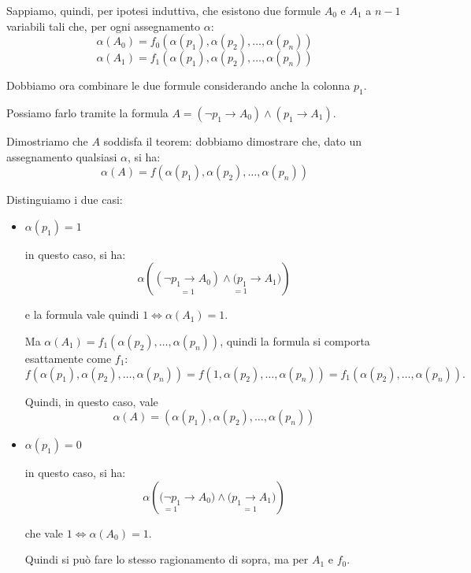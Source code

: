 \documentclass[a4paper,11pt]{report}
\begin{document}
\begin{proofbox}[title=dimostrazione]
\begin{itemize}
            Sappiamo, quindi, per ipotesi induttiva, che esistono due formule \( A_0 \) e \( A_1 \) a \( n-1 \) variabili tali che, per ogni assegnamento \( \alpha \):
            \[ \alpha(A_0) = f_0(\alpha(p_1), \alpha(p_2), \dots, \alpha(p_n)) \]
            \[ \alpha(A_1) = f_1(\alpha(p_1), \alpha(p_2), \dots, \alpha(p_n)) \]

            Dobbiamo ora combinare le due formule considerando anche la colonna \( p_1 \).

            Possiamo farlo tramite la formula \(A= (\neg p_1 \to A_0) \land (p_1 \to A_1) \).

            Dimostriamo che \( A \) soddisfa il teorem: dobbiamo dimostrare che, dato un assegnamento qualsiasi \( \alpha \), si ha:
    \[ \alpha(A) = f(\alpha(p_1), \alpha(p_2), \dots, \alpha(p_n)) \]

    Distinguiamo i due casi:
    \begin{itemize}
        \item \( \alpha(p_1) = 1 \) 

            in questo caso, si ha:
            \[
                \alpha\!\left(
                    \underset{=1}{(\neg p_1 \to A_0)}
                    \land
                \underset{=1}{(p_1} \to A_1)
                \right)
            \]

            e la formula vale quindi \( 1 \iff \alpha(A_1) = 1 \).

            Ma \( \alpha(A_1) = f_1(\alpha(p_2), \dots, \alpha(p_n)) \), quindi la formula si comporta esattamente come \( f_1 \):
            \[
                f(\alpha(p_1), \alpha(p_2), \ldots, \alpha(p_n))
                = f(1, \alpha(p_2), \ldots, \alpha(p_n))
                = f_1(\alpha(p_2), \ldots, \alpha(p_n)).
            \]

            Quindi, in questo caso, vale 
            \[\alpha(A) = (\alpha(p_1), \alpha(p_2), \ldots, \alpha(p_n))\]

        \item \( \alpha(p_1) = 0 \)            

            in questo caso, si ha:
            \[
                \alpha\!\left(
                    \underset{=1}{(\neg p_1} \to A_0)
                    \land
                    \underset{=1}{(p_1 \to A_1})
            \right)\]

            che vale \( 1 \iff \alpha(A_0)=1\).

            Quindi si può fare lo stesso ragionamento di sopra, ma per \( A_1 \) e \( f_0 \).


\end{itemize}
\end{itemize}
\end{proofbox}
\end{document}
